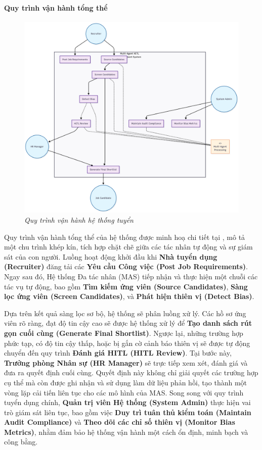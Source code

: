 \documentclass{article}
\begin{document}
\paragraph{Quy trình vận hành tổng thể}
\begin{figure}[H]
    \centering
    \includegraphics[width=0.9\linewidth]{img/recruitment-system-mas.png}
    \caption{\textit{Quy trình vận hành hệ thống tuyển}}
    \label{fig:recruitment-system-mas}
\end{figure}

Quy trình vận hành tổng thể của hệ thống được minh hoạ chi tiết tại \hyperref[fig:recruitment-system-mas]{\color{blue}{Hình 4.1}}, mô tả một chu trình khép kín, tích hợp chặt chẽ giữa các tác nhân tự động và sự giám sát của con người. Luồng hoạt động khởi đầu khi \textbf{Nhà tuyển dụng (Recruiter)} đăng tải các \textbf{Yêu cầu Công việc (Post Job Requirements)}. Ngay sau đó, Hệ thống Đa tác nhân (MAS) tiếp nhận và thực hiện một chuỗi các tác vụ tự động, bao gồm \textbf{Tìm kiếm ứng viên (Source Candidates)}, \textbf{Sàng lọc ứng viên (Screen Candidates)}, và \textbf{Phát hiện thiên vị (Detect Bias)}.

Dựa trên kết quả sàng lọc sơ bộ, hệ thống sẽ phân luồng xử lý. Các hồ sơ ứng viên rõ ràng, đạt độ tin cậy cao sẽ được hệ thống xử lý để \textbf{Tạo danh sách rút gọn cuối cùng (Generate Final Shortlist)}. Ngược lại, những trường hợp phức tạp, có độ tin cậy thấp, hoặc bị gắn cờ cảnh báo thiên vị sẽ được tự động chuyển đến quy trình \textbf{Đánh giá HITL (HITL Review)}. Tại bước này, \textbf{Trưởng phòng Nhân sự (HR Manager)} sẽ trực tiếp xem xét, đánh giá và đưa ra quyết định cuối cùng. Quyết định này không chỉ giải quyết các trường hợp cụ thể mà còn được ghi nhận và sử dụng làm dữ liệu phản hồi, tạo thành một vòng lặp cải tiến liên tục cho các mô hình của MAS. Song song với quy trình tuyển dụng chính, \textbf{Quản trị viên Hệ thống (System Admin)} thực hiện vai trò giám sát liên tục, bao gồm việc \textbf{Duy trì tuân thủ kiểm toán (Maintain Audit Compliance)} và \textbf{Theo dõi các chỉ số thiên vị (Monitor Bias Metrics)}, nhằm đảm bảo hệ thống vận hành một cách ổn định, minh bạch và công bằng.
\end{document}

